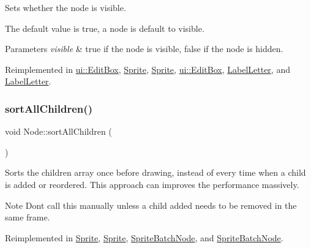 Sets whether the node is visible.

The default value is true, a node is default to visible.


\begin{DoxyParams}{Parameters}
{\em visible} & true if the node is visible, false if the node is hidden. \\
\hline
\end{DoxyParams}


Reimplemented in \hyperlink{classui_1_1EditBox_a73a03efc1b904b6386d037fdcdc7ff92}{ui\+::\+Edit\+Box}, \hyperlink{classSprite_a5bf8d98b0feb78acf0bbf4b3b3fa6d59}{Sprite}, \hyperlink{classSprite_abdaaa50259a13af3d6e8effded4ba42b}{Sprite}, \hyperlink{classui_1_1EditBox_afd90efc8e80090f96e54f39520405883}{ui\+::\+Edit\+Box}, \hyperlink{classLabelLetter_aa46db980ecd91de0f00c7aee1f2f52f9}{Label\+Letter}, and \hyperlink{classLabelLetter_aa46db980ecd91de0f00c7aee1f2f52f9}{Label\+Letter}.

\mbox{\label{classNode_adfaeea03013d3eae710c4d4d725bce0b}} 
\subsubsection{\texorpdfstring{sort\+All\+Children()}{sortAllChildren()}\hspace{0.1cm}{\footnotesize\ttfamily [1/2]}}
{\footnotesize\ttfamily void Node\+::sort\+All\+Children (\begin{DoxyParamCaption}{ }\end{DoxyParamCaption})\hspace{0.3cm}{\ttfamily [virtual]}}

Sorts the children array once before drawing, instead of every time when a child is added or reordered. This approach can improves the performance massively. \begin{DoxyNote}{Note}
Don\textquotesingle{}t call this manually unless a child added needs to be removed in the same frame. 
\end{DoxyNote}


Reimplemented in \hyperlink{classSprite_ae3553d2d41b7c9fb764fc0ca1b41ef86}{Sprite}, \hyperlink{classSprite_adf75ebee22c9ff3f4d72f99c86ff365c}{Sprite}, \hyperlink{classSpriteBatchNode_a939e68291147526d7d452a310b59b0b7}{Sprite\+Batch\+Node}, and \hyperlink{classSpriteBatchNode_af2a850d2c664d2fd1a796601129a0413}{Sprite\+Batch\+Node}.

